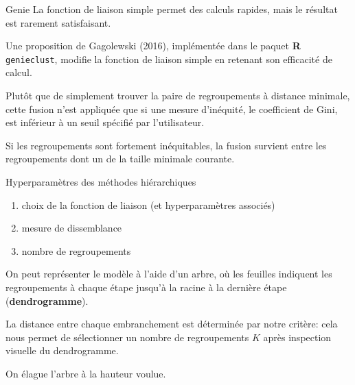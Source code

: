 \documentclass[
  ignorenonframetext,
]{beamer}
\providecommand{\tightlist}{%
  \setlength{\itemsep}{0pt}\setlength{\parskip}{0pt}}\usepackage{longtable,booktabs,array}
\begin{document}
\begin{frame}[fragile]{Genie}
\protect\hypertarget{genie}{}
La fonction de liaison simple permet des calculs rapides, mais le
résultat est rarement satisfaisant.

Une proposition de Gagolewski (2016), implémentée dans le paquet
\textbf{R} \texttt{genieclust}, modifie la fonction de liaison simple en
retenant son efficacité de calcul.

Plutôt que de simplement trouver la paire de regroupements à distance
minimale, cette fusion n'est appliquée que si une mesure d'inéquité, le
coefficient de Gini, est inférieur à un seuil spécifié par
l'utilisateur.

Si les regroupements sont fortement inéquitables, la fusion survient
entre les regroupements dont un de la taille minimale courante.
\end{frame}

\begin{frame}{Hyperparamètres des méthodes hiérarchiques}
\protect\hypertarget{hyperparamuxe8tres-des-muxe9thodes-hiuxe9rarchiques}{}
\begin{enumerate}
\tightlist
\item
  choix de la fonction de liaison (et hyperparamètres associés)
\item
  mesure de dissemblance
\item
  nombre de regroupements
\end{enumerate}

On peut représenter le modèle à l'aide d'un arbre, où les feuilles
indiquent les regroupements à chaque étape jusqu'à la racine à la
dernière étape (\textbf{dendrogramme}).

La distance entre chaque embranchement est déterminée par notre critère:
cela nous permet de sélectionner un nombre de regroupements \(K\) après
inspection visuelle du dendrogramme.

On élague l'arbre à la hauteur voulue.
\end{frame}
\end{document}
